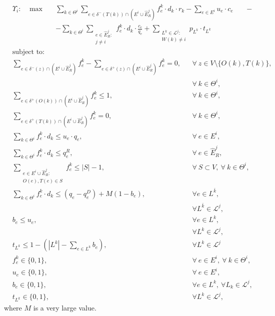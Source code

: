 \documentclass[authoryear]{elsarticle}
\begin{document}
    \begin{align}
        &  \Upsilon_i: \hspace{10pt} \max  &&  \sum_{k\in \Theta^i} \sum_{e \in \delta^-(T(k))\cap (E^i\cup \widehat{E}_R^j)} f_e^k \cdot d_k \cdot r_k - \sum_{e\in E^i} u_e\cdot c_e \hspace{20pt} -  \nonumber  \label{eq:IterativeA}\\
        & 								  && - \sum_{k \in \Theta^i} \sum_{\substack{e \in \widehat{E}_R^j\colon \\ j\not = i}} f_e^k \cdot d_k \cdot \frac{c_e}{q_e}   + \sum_{\substack{L^k \in \mathcal{L}^j \colon \\ W(k)\not = i}} p_{L^k} \cdot t_{L^k}
    \end{align}
    \begin{align}
        & \text{subject to:}       && \nonumber\\
& \sum_{e \in \delta^-(z)\cap (E^i\cup \widehat{E}_R^j)} f_e^k-\sum_{e \in \delta^+(z)\cap (E^i\cup \widehat{E}_R^j)} f_{e}^k  = 0,                                   && \forall\ z\in V\setminus\{O(k),T(k)\},\nonumber\\[-1em]
& && \forall\ k\in\Theta^i,  \label{eq:IterativeB}\\[1em]
& \sum_{e \in \delta^+(O(k))\cap (E^i\cup \widehat{E}_R^j)} f_e^k  \leq 1, && \forall\ k\in \Theta^i, \label{eq:IterativeC} \\
& \sum_{e \in \delta^+(T(k))\cap (E^i\cup \widehat{E}_R^j)} f_e^k  = 0,  && \forall\ k\in \Theta^i, \label{eq:IterativeD} \\
& \sum_{k \in \Theta^i} f_e^k\cdot d_k \leq u_e\cdot q_e, && \forall\ e \in E^i, \label{eq:IterativeE}  \\
& \sum_{k \in \Theta^i} f_e^k\cdot d_k \leq  q_e^R, && \forall\ e \in \widehat{E}_R^j,\label{eq:IterativeF}  \\
& \sum_{\substack{e \in E^i\cup \widehat{E}_R^j\colon \\ O(e),T(e) \in S}}  f_e^k  \leq |S| -1, && \forall\ S \subset V,\ \forall\ k \in \Theta^i, \label{eq:IterativeG}\\
&\sum_{k\in \Theta^i} f_e^k \cdot d_k \leq (q_e - q_e^D) +M(1-b_e),\quad && \forall e \in L^{\bar{k}},\nonumber\\[-5pt]
& && \forall L^{\bar{k}} \in \mathcal{L}^j, \label{eq:IterativeH}\\[5pt]
&b_e \leq u_e, && \forall e\in L^k,\nonumber\\[-5pt]
& && \forall L^k \in \mathcal{L}^j, \label{eq:IterativeI}\\[5pt]
& t_{L^k} \leq 1 -  (|L^k|-\sum_{e \in L^k} b_e), && \forall L^k \in \mathcal{L}^j \label{eq:IterativeJ}\\
& f_e^k  \in \{0,1\}, && \forall\ e \in E^i,\ \forall\ k \in \Theta^i, \label{eq:IterativeK} \\
&  u_e   \in \{0,1\},   && \forall\ e \in E^i,  \label{eq:IterativeL}\\
& b_e \in \{0,1\}, && \forall e \in L^k,\ \forall L_k\in \mathcal{L}^j,\label{eq:IterativeM}\\[5pt]
& t_{L^k} \in \{0,1\}, && \forall L^k \in \mathcal{L}^j, \label{eq:IterativeN}
    \end{align}
where $M$ is a very large value.
\end{document}
